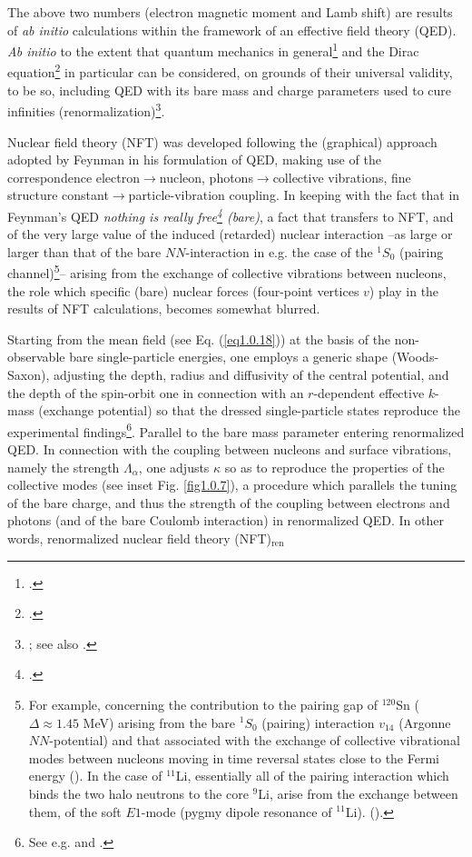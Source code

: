 The above two numbers (electron magnetic moment and Lamb shift) are results of \textit{ab initio} calculations within the framework of an effective field theory (QED). \textit{Ab initio} to the extent that quantum mechanics in general\footnote{\cite{Heisenberg:25,Born:25a,Born:25b,Dirac:25,Schrodinger:26,Born:26,Heisenberg:27,Pauli:25}.} and the Dirac equation\footnote{\cite{Dirac:28a,Dirac:28b}.} in particular can be considered, on grounds of their universal validity, to be so, including QED with its bare mass and charge parameters used to cure infinities (renormalization)\footnote{\cite{Feynman:49,Schwinger:48,Tomonaga:46}; see also \cite{Dyson:49,Schwinger:58,Schweber:94}.}.

Nuclear field theory (NFT) was developed following the (graphical) approach adopted by Feynman in his formulation of QED, making use of the correspondence electron$\to$nucleon, photons$\to$collective vibrations, fine structure constant$\to$particle-vibration coupling. In keeping with the  fact that in Feynman's QED \textit{nothing is really free\footnote{\cite{Feynman:75}.} (bare)}, a fact that transfers to NFT,  and of the very large value of the induced (retarded) nuclear  interaction --as large or larger than that of the bare $NN$-interaction in e.g. the case of the $^1S_0$ (pairing channel)\footnote{For example, concerning the contribution to the pairing gap of $^{120}$Sn ($\Delta\approx1.45$ MeV) arising from the bare $^1S_0$ (pairing) interaction $v_{14}$ (Argonne $NN$-potential) and that associated with the exchange of collective vibrational modes between nucleons moving in time reversal states close to the Fermi energy (\cite{Idini:15}). In the case of $^{11}$Li, essentially all of the pairing interaction which binds the two halo neutrons to the core $^9$Li, arise from the exchange between them, of the soft $E1$-mode (pygmy dipole resonance  of $^{11}$Li). (\cite{Barranco:01,Broglia:19}). }-- arising from the exchange of collective vibrations between nucleons, the role which specific (bare) nuclear forces (four-point vertices $v$) play in the results of NFT calculations, becomes somewhat blurred. 


Starting from the mean field (see Eq. (\ref{eq1.0.18})) at the basis of the non-observable bare single-particle energies, one employs a generic shape (Woods-Saxon), adjusting the depth, radius and diffusivity of the central potential, and the depth of the spin-orbit one in  connection with an $r$-dependent effective $k$-mass (exchange potential) so that the dressed single-particle states reproduce the experimental findings\footnote{See e.g. \cite{Barranco:17} and \cite{Barranco:20}.}. Parallel to the bare mass parameter entering renormalized QED.
In connection with the coupling between nucleons and surface vibrations, namely the strength $\Lambda_\alpha$, one adjusts $\kappa$ so as to reproduce the properties of the collective modes (see inset Fig. \ref{fig1.0.7}), a procedure which parallels the tuning of the bare charge, and thus the strength of the coupling between electrons and photons (and of the bare Coulomb interaction) in renormalized QED. In other words, renormalized nuclear field theory (NFT)$_{\text{ren}}$

